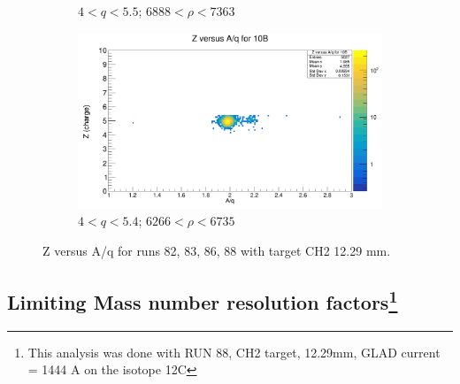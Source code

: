 \documentclass[12pt, letterpaper]{article}
\begin{document}
\begin{figure}[!htbp]
\begin{subfigure}{.5\textwidth}
  \caption{$4 < q < 5.5$; $6888 < \rho < 7363$}
  \label{fig:sub-second}
\end{subfigure}
\begin{subfigure}{.5\textwidth}
  \centering
  \includegraphics[width=.9\linewidth]{z_vs_aq_10b.png} 
  \caption{$4 < q < 5.4$; $ 6266 < \rho < 6735$}
  \label{fig:sub-second}
\end{subfigure}
\caption{Z versus A/q for runs 82, 83, 86, 88 with target CH2 12.29 mm.}
\label{fig:iso_fit}
\end{figure}


\subsection{Limiting Mass number resolution factors\footnote{This analysis was done with RUN 88, CH2 target, 12.29mm, GLAD current = 1444 A on the isotope 12C}}
\end{document}
